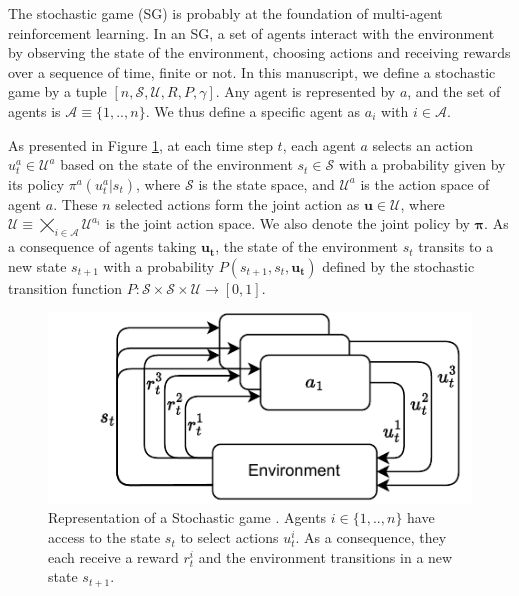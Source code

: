 
The stochastic game (SG) \citep{stochasticGames} is probably at the foundation of multi-agent reinforcement learning.
In an SG, a set of agents interact with the environment by observing the state of the environment, choosing actions and receiving rewards over a sequence of time, finite or not.
In this manuscript, we define a stochastic game by a tuple $[n, \mathcal{S}, \mathcal{U}, R, P, \gamma]$.
Any agent is represented by $a$, and the set of agents is $\mathcal{A} \equiv \{1,..,n\}$.
We thus define a specific agent as $a_i$ with $i \in \mathcal{A}$.

As presented in Figure \ref{fig:ch2_sg}, at each time step $t$, each agent $a$ selects an action $u_t^a \in \mathcal{U}^a$ based on the state of the environment $s_t \in \mathcal{S}$ with a probability given by its policy $\pi^a(u^a_t|s_t)$, where $\mathcal{S}$ is the state space, and $\mathcal{U}^a$ is the action space of agent $a$.
These $n$ selected actions form the joint action as $\mathbf{u} \in \mathcal{U}$, where $\mathcal{U} \equiv \bigtimes_{i \in \mathcal{A}} \mathcal{U}^{a_i}$ is the joint action space.
We also denote the joint policy by $\mathbf{\pi}$.
As a consequence of agents taking $\mathbf{u_t}$, the state of the environment $s_t$ transits to a new state $s_{t+1}$ with a probability $P(s_{t+1}, s_t, \mathbf{u_t})$ defined by the stochastic transition function $P:\mathcal{S} \times \mathcal{S} \times \mathcal{U} \rightarrow [0,1]$.

\begin{figure}
    \centering
    \includegraphics[width=.8\textwidth]{tex_thesis/figures/ch2/SG.pdf}
    \caption{Representation of a Stochastic game \citep{stochasticGames}. Agents $i \in \{1,..,n\}$ have access to the state $s_t$ to select actions $u_t^i$. As a consequence, they each receive a reward $r_t^i$ and the environment transitions in a new state $s_{t+1}$.}
    \label{fig:ch2_sg}
\end{figure}


